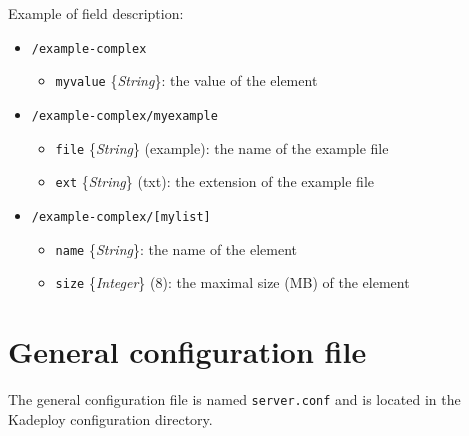 \documentclass[a4wide,10pt,oneside]{book}
\newcommand{\ypath}[1]{\texttt{#1}}
\newcommand{\yfield}[2]{\texttt{#1} {\small\{{\emph{#2}}\}}:}
\newcommand{\yfieldd}[3]{\texttt{#1} {\small\{{\emph{#2}}\}} {\small(}#3{\small)}:}
\begin{document}
Example of field description:
\begin{itemize}
  \item \ypath{/example-complex}
  \begin{itemize}
    \item \yfield{myvalue}{String} the value of the element
  \end{itemize}
  \item \ypath{/example-complex/myexample}
  \begin{itemize}
    \item \yfieldd{file}{String}{example} the name of the example file
    \item \yfieldd{ext}{String}{txt} the extension of the example file
  \end{itemize}
  \item \ypath{/example-complex/[mylist]}
  \begin{itemize}
    \item \yfield{name}{String} the name of the element
    \item \yfieldd{size}{Integer}{8} the maximal size (MB) of the element
  \end{itemize}
\end{itemize}

\section{General configuration file}\label{sec:general_config}
The general configuration file is named \texttt{server.conf} and is located in the Kadeploy configuration directory.
\end{document}
